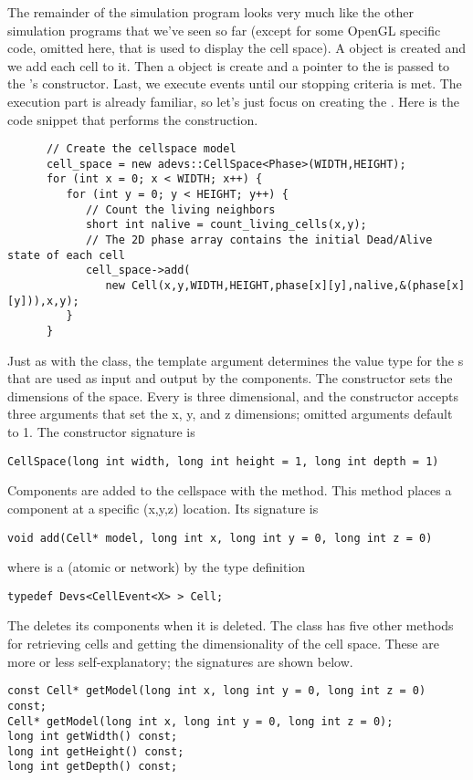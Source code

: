 The remainder of the simulation program looks very much like the other simulation programs that we've seen so far (except for some OpenGL specific code, omitted here, that is used to display the cell space). A  object is created and we add each cell to it. Then a  object is create and a pointer to the  is passed to the 's constructor. Last, we execute events until our stopping criteria is met. The execution part is already familiar, so let's just focus on creating the . Here is the code snippet that performs the construction.
\begin{verbatim}
      // Create the cellspace model
      cell_space = new adevs::CellSpace<Phase>(WIDTH,HEIGHT);
      for (int x = 0; x < WIDTH; x++) {
         for (int y = 0; y < HEIGHT; y++) {
            // Count the living neighbors
            short int nalive = count_living_cells(x,y);
            // The 2D phase array contains the initial Dead/Alive state of each cell
            cell_space->add(
               new Cell(x,y,WIDTH,HEIGHT,phase[x][y],nalive,&(phase[x][y])),x,y);
         }
      }
\end{verbatim}
Just as with the  class, the  template argument determines the value type for the s that are used as input and output by the  components. The  constructor sets the dimensions of the space. Every  is three dimensional, and the constructor accepts three arguments that set the x, y, and z dimensions; omitted arguments default to 1. The constructor signature is
\begin{verbatim}
CellSpace(long int width, long int height = 1, long int depth = 1)
\end{verbatim}

Components are added to the cellspace with the  method. This method places a component at a specific (x,y,z) location. Its signature is
\begin{verbatim}
void add(Cell* model, long int x, long int y = 0, long int z = 0)
\end{verbatim}
where  is a  (atomic or network) by the type definition
\begin{verbatim}
typedef Devs<CellEvent<X> > Cell;
\end{verbatim}
The  deletes its components when it is deleted.
The  class has five other methods for retrieving cells and getting the dimensionality of the cell space. These are more or less self-explanatory; the signatures are shown below.
\begin{verbatim}
const Cell* getModel(long int x, long int y = 0, long int z = 0) const;
Cell* getModel(long int x, long int y = 0, long int z = 0);
long int getWidth() const;
long int getHeight() const;
long int getDepth() const;
\end{verbatim}

